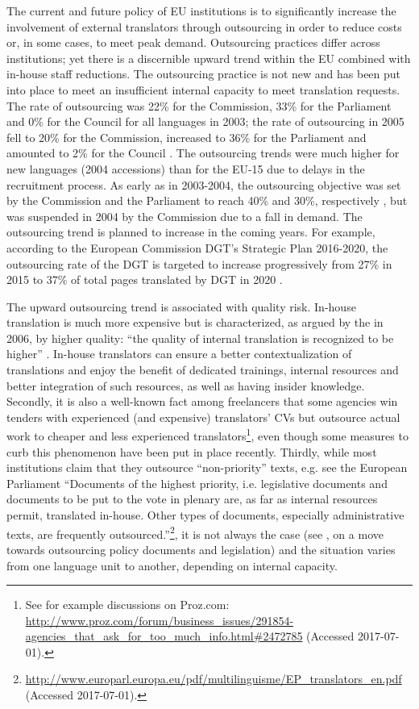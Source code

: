 \documentclass[output=paper]{langsci/langscibook}
\begin{document}
The current and future policy of EU institutions is to significantly increase the involvement of external translators through outsourcing in order to reduce costs or, in some cases, to meet peak demand. Outsourcing practices differ across institutions; yet there is a discernible upward trend within the EU combined with in-house staff reductions. The outsourcing practice is not new and has been put into place to meet an insufficient internal capacity to meet translation requests. The rate of outsourcing was 22\% for the Commission, 33\% for the Parliament and 0\% for the Council for all languages in 2003; the rate of outsourcing in 2005 fell to 20\% for the Commission, increased to 36\% for the Parliament and amounted to 2\% for the Council \citep{EuropeanCourt2006}. The outsourcing trends were much higher for new languages (2004 accessions) than for the EU-15 due to delays in the recruitment process. As early as in 2003-2004, the outsourcing objective was set by the Commission and the Parliament to reach 40\% and 30\%, respectively \citep{EuropeanCourt2006}, but was suspended in 2004 by the Commission due to a fall in demand. The outsourcing trend is planned to increase in the coming years. For example, according to the European Commission DGT’s Strategic Plan 2016-2020, the outsourcing rate of the DGT is targeted to increase progressively from 27\% in 2015 to 37\% of total pages translated by DGT in 2020 \citeyear[11]{DGT2016b}. 

The upward outsourcing trend is associated with quality risk. In-house translation is much more expensive but is characterized, as argued by the \citeauthor{EuropeanCourt2006} in 2006, by higher quality: “the quality of internal translation is recognized to be higher” \citeyear{EuropeanCourt2006}. In-house translators can ensure a better contextualization of translations and enjoy the benefit of dedicated trainings, internal resources and better integration of such resources, as well as having insider knowledge. Secondly, it is also a well-known fact among freelancers that some agencies win tenders with experienced (and expensive) translators’ CVs but outsource actual work to cheaper and less experienced translators\footnote{See for example discussions on Proz.com: \url{http://www.proz.com/forum/business_issues/291854-agencies_that_ask_for_too_much_info.html\#2472785} (Accessed 2017-07-01).}, even though some measures to curb this phenomenon have been put in place recently. Thirdly, while most institutions claim that they outsource “non-priority” texts, e.g. see the European Parliament “Documents of the highest priority, i.e. legislative documents and documents to be put to the vote in plenary are, as far as internal resources permit, translated in-house. Other types of documents, especially administrative texts, are frequently outsourced.”\footnote{\url{http://www.europarl.europa.eu/pdf/multilinguisme/EP_translators_en.pdf} (Accessed 2017-07-01).}, it is not always the case (see \citealt{Strandvik2017forthcoming}, on a move towards outsourcing policy documents and legislation) and the situation varies from one language unit to another, depending on internal capacity.
\end{document}
